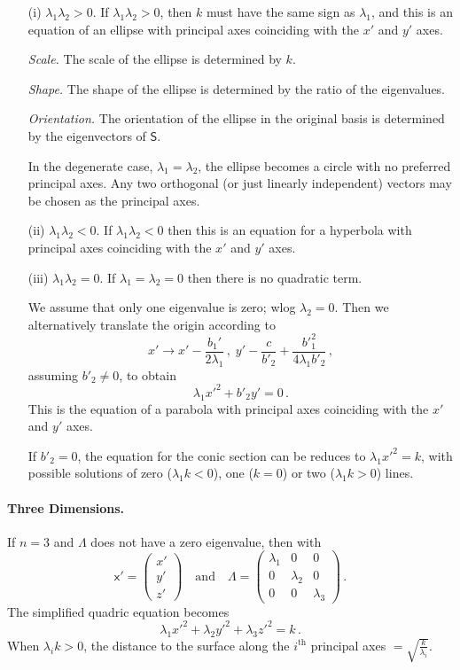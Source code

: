 \documentclass{article}
\theoremstyle{plain}\theoremheaderfont{\normalfont\itshape}\theorembodyfont{\rmfamily}\theoremseparator{.}\newtheorem*{rem}{Remark}\newtheorem*{ex}{Example}\newtheorem*{proof}{Proof}\newtheorem*{altp}{Alternative proof}
\theoremstyle{plain}\theoremheaderfont{\normalfont\bfseries}\theorembodyfont{\rmfamily}\theoremseparator{.}\newtheorem{thm}{Theorem}[section]\newtheorem{lem}[thm]{Lemma}\newtheorem{prop}[thm]{Proposition}\newtheorem*{cor}{Corollary}\newtheorem{defn}[thm]{Definition}\newtheorem{clm}[thm]{Claim}\newtheorem{clminproof}{Claim}
\theoremstyle{break}\theoremheaderfont{\normalfont\itshape}\theorembodyfont{\rmfamily}\theoremseparator{.\medskip}\newtheorem*{proofskip}{Proof}\newtheorem*{exs}{Examples}\newtheorem*{rems}{Remarks}
\theoremstyle{break}\theoremheaderfont{\normalfont\bfseries}\theorembodyfont{\rmfamily}\theoremseparator{.\medskip}\newtheorem{lemskip}[thm]{Lemma}\newtheorem{defnskip}[thm]{Definition}\newtheorem{propskip}[thm]{Proposition}\newtheorem{thmskip}[thm]{Theorem}
\numberwithin{equation}{section}
\begin{document}
	\begin{itemize}[topsep=0pt,parsep=1em]
		\item[(i)] \(\lambda_1\lambda_2>0\). If \(\lambda_1\lambda_2>0\), then \(k\) must have the same sign as \(\lambda_1\), and this is an equation of an ellipse with principal axes coinciding with the \(x'\) and \(y'\) axes.
		
		\textit{Scale.} The scale of the ellipse is determined by \(k\).
		
		\textit{Shape.} The shape of the ellipse is determined by the ratio of the eigenvalues.
		
		\textit{Orientation.} The orientation of the ellipse in the original basis is determined by the eigenvectors of \(\mathsf{S}\).
		
		In the degenerate case, \(\lambda_1=\lambda_2\), the ellipse becomes a circle with no preferred principal axes. Any two orthogonal (or just linearly independent) vectors may be chosen as the principal axes. 
		\item[(ii)] \(\lambda_1\lambda_2<0\). If \(\lambda_1\lambda_2<0\) then this is an equation for a hyperbola with principal axes coinciding with the \(x'\) and \(y'\) axes.
		\item[(iii)] \(\lambda_1\lambda_2=0\). If \(\lambda_1=\lambda_2=0\) then there is no quadratic term.
		
		We assume that only one eigenvalue is zero; wlog \(\lambda_2=0\). Then we alternatively translate the origin according to
		\[x'\to x'-\frac{b_1'}{2\lambda_1}\,,\;y'-\frac{c}{b'_2}+\frac{{b'}_1^2}{4\lambda_1 b'_2}\,,\]
		assuming \(b'_2\ne 0\), to obtain
		\[\lambda_1 x'^2+b'_2y'=0\,.\]
		This is the equation of a parabola with principal axes coinciding with the \(x'\) and \(y'\) axes.
		
		If \(b'_2=0\), the equation for the conic section can be reduces to \(\lambda_1 x'^2=k\), with possible solutions of zero (\(\lambda_1 k<0\)), one (\(k=0\)) or two (\(\lambda_1k>0\)) lines. 
	\end{itemize}
	
	\paragraph{Three Dimensions.} If \(n=3\) and \(\mathsf{\Lambda}\) does not have a zero eigenvalue, then with
	\[\mathsf{x}'=\begin{pmatrix}
		x' \\ y' \\ z'
	\end{pmatrix}\quad\text{and}\quad\mathsf{\Lambda}=\begin{pmatrix}
		\lambda_1 & 0 & 0\\
		0 & \lambda_2 & 0\\
		0 & 0 & \lambda_3
	\end{pmatrix}\,.\]
	The simplified quadric equation becomes
	\[\lambda_1 x'^2+\lambda_2 y'^2+\lambda_3 z'^2=k\,.\]
	When \(\lambda_i k>0\), the distance to the surface along the \(i^\text{th}\) principal axes \(=\sqrt{\frac{k}{\lambda_i}}\).
	
\end{document}
